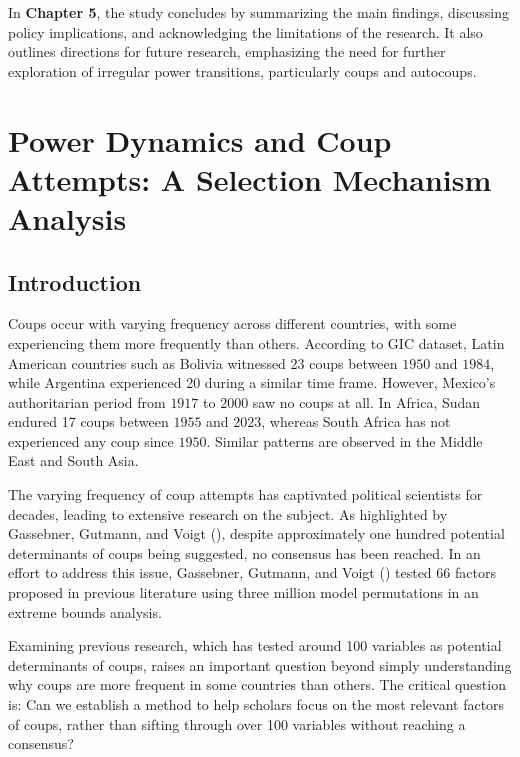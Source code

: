 \documentclass[
  12pt,
]{report}
\begin{document}
In \textbf{Chapter 5}, the study concludes by summarizing the main
findings, discussing policy implications, and acknowledging the
limitations of the research. It also outlines directions for future
research, emphasizing the need for further exploration of irregular
power transitions, particularly coups and autocoups.

\chapter{Power Dynamics and Coup Attempts: A Selection Mechanism
Analysis}\label{power-dynamics-and-coup-attempts-a-selection-mechanism-analysis}

\section{Introduction}\label{introduction-1}

Coups occur with varying frequency across different countries, with some
experiencing them more frequently than others. According to GIC dataset,
Latin American countries such as Bolivia witnessed 23 coups between
\(1950\) and \(1984\), while Argentina experienced 20 during a similar
time frame. However, Mexico's authoritarian period from \(1917\) to
\(2000\) saw no coups at all. In Africa, Sudan endured 17 coups between
\(1955\) and \(2023\), whereas South Africa has not experienced any coup
since \(1950\). Similar patterns are observed in the Middle East and
South Asia.

The varying frequency of coup attempts has captivated political
scientists for decades, leading to extensive research on the subject. As
highlighted by Gassebner, Gutmann, and Voigt
(), despite approximately one hundred
potential determinants of coups being suggested, no consensus has been
reached. In an effort to address this issue, Gassebner, Gutmann, and
Voigt () tested 66 factors proposed in
previous literature using three million model permutations in an extreme
bounds analysis.

Examining previous research, which has tested around 100 variables as
potential determinants of coups, raises an important question beyond
simply understanding why coups are more frequent in some countries than
others. The critical question is: Can we establish a method to help
scholars focus on the most relevant factors of coups, rather than
sifting through over 100 variables without reaching a consensus?
\end{document}

